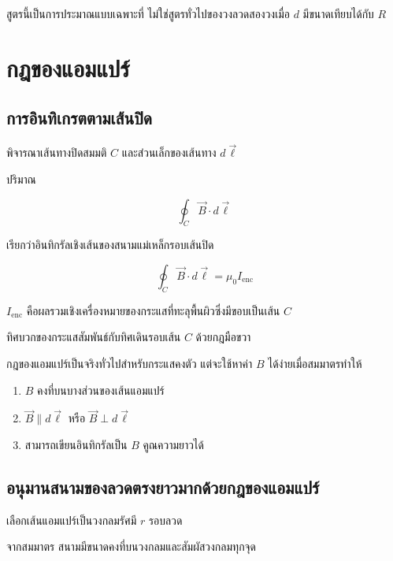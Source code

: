 สูตรนี้เป็นการประมาณแบบเฉพาะที่ ไม่ใช่สูตรทั่วไปของวงลวดสองวงเมื่อ $d$ มีขนาดเทียบได้กับ $R$

\section{กฎของแอมแปร์}

\subsection{การอินทิเกรตตามเส้นปิด}

พิจารณาเส้นทางปิดสมมติ $C$ และส่วนเล็กของเส้นทาง $d\vec{\ell}$

ปริมาณ

\[
\oint_C\vec{B}\cdot d\vec{\ell}
\]

เรียกว่าอินทิกรัลเชิงเส้นของสนามแม่เหล็กรอบเส้นปิด

\begin{tcolorbox}[title={กฎของแอมแปร์สำหรับกระแสคงตัว}]
\[
\boxed{
\oint_C\vec{B}\cdot d\vec{\ell}
=
\mu_0I_{\text{enc}}}
\]
\end{tcolorbox}

$I_{\text{enc}}$ คือผลรวมเชิงเครื่องหมายของกระแสที่ทะลุพื้นผิวซึ่งมีขอบเป็นเส้น $C$

ทิศบวกของกระแสสัมพันธ์กับทิศเดินรอบเส้น $C$ ด้วยกฎมือขวา

\begin{tcolorbox}[title={กฎของแอมแปร์เหมาะกับกรณีใด}]
กฎของแอมแปร์เป็นจริงทั่วไปสำหรับกระแสคงตัว แต่จะใช้หาค่า $B$ ได้ง่ายเมื่อสมมาตรทำให้

\begin{enumerate}
    \item $B$ คงที่บนบางส่วนของเส้นแอมแปร์
    \item $\vec{B}\parallel d\vec{\ell}$ หรือ $\vec{B}\perp d\vec{\ell}$
    \item สามารถเขียนอินทิกรัลเป็น $B$ คูณความยาวได้
\end{enumerate}
\end{tcolorbox}

\subsection{อนุมานสนามของลวดตรงยาวมากด้วยกฎของแอมแปร์}

เลือกเส้นแอมแปร์เป็นวงกลมรัศมี $r$ รอบลวด

จากสมมาตร สนามมีขนาดคงที่บนวงกลมและสัมผัสวงกลมทุกจุด

